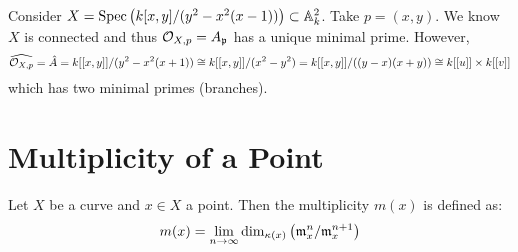 \documentclass[12pt]{article}
\begin{document}
\begin{example}
Consider $X = \mathrm{Spec}\left( k[x, y]/(y^2 - x^2(x-1)) \right) \subset \mathbb{A}^2_k$. Take $p = (x, y)$. We know $X$ is connected and thus $\mathcal{O}_{X, p} = A_{\mathfrak{p}}$ has a unique minimal prime. However, 
\[ \widehat{\mathcal{O}_{X, p}} = \hat{A} = k[[x, y]] / (y^2 - x^2(x + 1)) \cong k[[x, y]]/(x^2 - y^2) = k[[x, y]]/((y - x)(x + y)) \cong k[[u]] \times k[[v]] \]
which has two minimal primes (branches). 
\end{example}


\section{Multiplicity of a Point}


\begin{defn}
Let $X$ be a curve and $x \in X$ a point. Then the multiplicity $m(x)$ is defined as:
\[ m(x) = \lim_{n \to \infty} \dim_{\kappa(x)} \left( \mathfrak{m}_x^n / \mathfrak{m}_x^{n+1} \right) \]
\end{defn}
\end{document}
